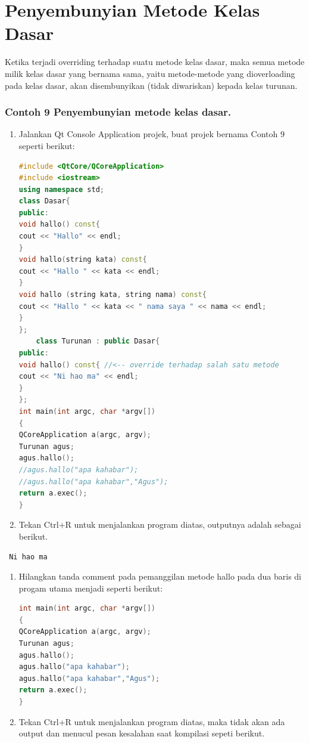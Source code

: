 \section{Penyembunyian Metode Kelas
Dasar}\label{penyembunyian-metode-kelas-dasar}

Ketika terjadi overriding terhadap suatu metode kelas dasar, maka semua
metode milik kelas dasar yang bernama sama, yaitu metode-metode yang
dioverloading pada kelas dasar, akan disembunyikan (tidak diwariskan)
kepada kelas turunan.

\subsubsection*{Contoh 9 Penyembunyian metode kelas dasar.}

\begin{enumerate}
\def\labelenumi{\arabic{enumi}.}
\item
  Jalankan Qt Console Application projek, buat projek bernama Contoh 9
  seperti berikut:

\begin{lstlisting}[language=c++]
#include <QtCore/QCoreApplication>
#include <iostream>
using namespace std;
class Dasar{
public:
void hallo() const{
cout << "Hallo" << endl;
}
void hallo(string kata) const{
cout << "Hallo " << kata << endl;
}
void hallo (string kata, string nama) const{
cout << "Hallo " << kata << " nama saya " << nama << endl;
}
};
    class Turunan : public Dasar{
public:
void hallo() const{ //<-- override terhadap salah satu metode
cout << "Ni hao ma" << endl;
}
};
int main(int argc, char *argv[])
{
QCoreApplication a(argc, argv);
Turunan agus;
agus.hallo();
//agus.hallo("apa kahabar");
//agus.hallo("apa kahabar","Agus");
return a.exec();
}
\end{lstlisting}
\item
  Tekan Ctrl+R untuk menjalankan program diatas, outputnya adalah
  sebagai berikut.
\end{enumerate}

\begin{verbatim}
 Ni hao ma
\end{verbatim}

\begin{enumerate}
\def\labelenumi{\arabic{enumi}.}
\setcounter{enumi}{2}
\item
  Hilangkan tanda comment pada pemanggilan metode hallo pada dua baris
  di progam utama menjadi seperti berikut:

\begin{lstlisting}[language=c++]
int main(int argc, char *argv[])
{
QCoreApplication a(argc, argv);
Turunan agus;
agus.hallo();
agus.hallo("apa kahabar");
agus.hallo("apa kahabar","Agus");
return a.exec();
}
\end{lstlisting}
\item
  Tekan Ctrl+R untuk menjalankan program diatas, maka tidak akan ada
  output dan menucul pesan kesalahan saat kompilasi sepeti berikut.
\end{enumerate}

